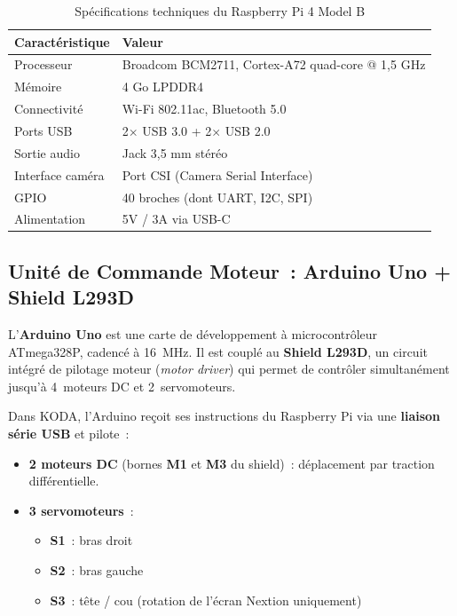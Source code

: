 \documentclass[a4paper,12pt]{report}
\begin{document}
	\begin{table}[htbp]
		\centering
		\caption{Spécifications techniques du Raspberry Pi 4 Model B}
		\label{tab:rpi4_specs}
		\renewcommand{\arraystretch}{1.2}
		\begin{tabular}{|l|l|}
			\hline
			\textbf{Caractéristique} & \textbf{Valeur} \\
			\hline
			Processeur & Broadcom BCM2711, Cortex-A72 quad-core @ 1{,}5 GHz \\
			\hline
			Mémoire & 4 Go LPDDR4 \\
			\hline
			Connectivité & Wi-Fi 802.11ac, Bluetooth 5.0 \\
			\hline
			Ports USB & 2$\times$ USB 3.0 + 2$\times$ USB 2.0 \\
			\hline
			Sortie audio & Jack 3{,}5 mm stéréo \\
			\hline
			Interface caméra & Port CSI (Camera Serial Interface) \\
			\hline
			GPIO & 40 broches (dont UART, I2C, SPI) \\
			\hline
			Alimentation & 5V / 3A via USB-C \\
			\hline
		\end{tabular}
	\end{table}
	
	\subsection{Unité de Commande Moteur~: Arduino Uno + Shield L293D}
	
	L'\textbf{Arduino Uno} est une carte de développement à microcontrôleur
	ATmega328P, cadencé à 16~MHz. Il est couplé au \textbf{Shield L293D},
	un circuit intégré de pilotage moteur (\textit{motor driver}) qui permet de
	contrôler simultanément jusqu'à 4~moteurs DC et 2~servomoteurs.
	
	Dans KODA, l'Arduino reçoit ses instructions du Raspberry Pi via une
	\textbf{liaison série USB} et pilote~:
	\begin{itemize}
		\item \textbf{2 moteurs DC} (bornes \textbf{M1} et \textbf{M3} du shield)~:
		déplacement par traction différentielle.
		\item \textbf{3 servomoteurs}~:
		\begin{itemize}
			\item \textbf{S1}~: bras droit
			\item \textbf{S2}~: bras gauche
			\item \textbf{S3}~: tête / cou (rotation de l'écran Nextion uniquement)
		\end{itemize}
	\end{itemize}
	
\end{document}
